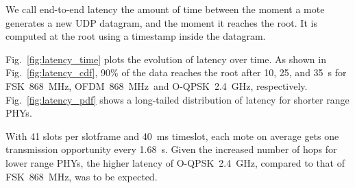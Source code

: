 \documentclass[sensors,article,submit,moreauthors,pdftex]{Definitions/mdpi}
\newcommand{\fsk}           {FSK~868~MHz}
\newcommand{\oqpsk}         {O-QPSK~2.4~GHz}
\newcommand{\ofdm}          {OFDM~868~MHz}
\begin{document}

We call end-to-end latency the amount of time between the moment a mote generates a new UDP datagram, and the moment it reaches the root.
It is computed at the root using a timestamp inside the datagram.


Fig.~\ref{fig:latency_time} plots the evolution of latency over time.
As shown in Fig.~\ref{fig:latency_cdf}, 90\% of the data reaches the root after 10, 25, and 35~s for \fsk, \ofdm\ and \oqpsk, respectively.
Fig.~\ref{fig:latency_pdf} shows a long-tailed distribution of latency for shorter range PHYs.


With 41 slots per slotframe and 40~ms timeslot, each mote on average gets one transmission opportunity every 1.68~s.
Given the increased number of hops for lower range PHYs, the higher latency of \oqpsk, compared to that of \fsk, was to be expected.
\end{document}
